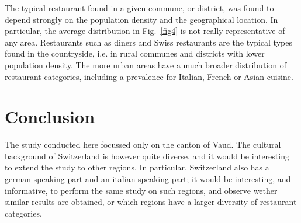 \documentclass[12pt]{article}
\begin{document}
The typical restaurant found in a given commune, or district, was found to depend strongly on the population density and the geographical location. In particular, the average distribution in Fig.~\ref{fig4} is not really representative of any area. Restaurants such as diners and Swiss restaurants are the typical types found in the countryside, i.e. in rural communes and districts with lower population density. The more urban areas have a much broader distribution of restaurant categories, including a prevalence for Italian, French or Asian cuisine. 


\section{Conclusion}

The study conducted here focussed only on the canton of Vaud. The cultural background of Switzerland is however quite diverse, and it would be interesting to extend the study to other regions. In particular, Switzerland also has a german-speaking part and an italian-speaking part; it would be interesting, and informative, to perform the same study on such regions, and observe wether similar results are obtained, or which regions have a larger diversity of restaurant categories.
\end{document}
